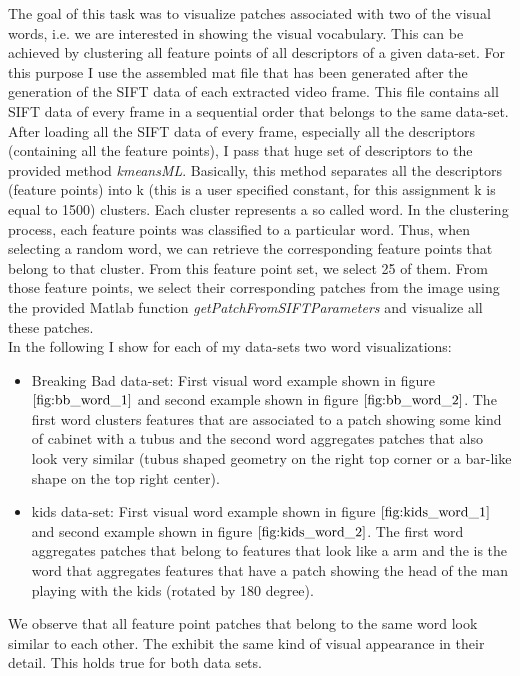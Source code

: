 \documentclass{paper}
\begin{document}
The goal of this task was to visualize patches associated with two of the visual words, i.e. we are interested in showing the visual vocabulary. This can be achieved by clustering all feature points of all descriptors of a given data-set. For this purpose I use the assembled mat file that has been generated after the generation of the SIFT data of each extracted video frame. This file contains all SIFT data of every frame in a sequential order that belongs to the same data-set. \\

After loading all the SIFT data of every frame, especially all the descriptors (containing all the feature points), I pass that huge set of descriptors to the provided method \emph{kmeansML}. Basically, this method separates all the descriptors (feature points) into k (this is a user specified constant, for this assignment k is equal to 1500) clusters. Each cluster represents a so called word. In the clustering process, each feature points was classified to a particular word. Thus, when selecting a random word, we can retrieve the corresponding feature points that belong to that cluster. From this feature point set, we select 25 of them. From those feature points, we select their corresponding patches from the image using the provided Matlab function \emph{getPatchFromSIFTParameters} and visualize all these patches. \\

In the following I show for each of my data-sets two word visualizations:
\begin{itemize}
    \item Breaking Bad data-set: First visual word example shown in figure $\ref{fig:bb_word_1}$ and second example shown in figure $\ref{fig:bb_word_2}$. The first word clusters features that are associated to a patch showing some kind of cabinet with a tubus and the second word aggregates patches that also look very similar (tubus shaped geometry on the right top corner or a bar-like shape on the top right center).
    \item kids data-set: First visual word example shown in figure $\ref{fig:kids_word_1}$ and second example shown in figure $\ref{fig:kids_word_2}$. The first word aggregates patches that belong to features that look like a arm and the is the word that aggregates features that have a patch showing the head of the man playing with the kids (rotated by 180 degree).
\end{itemize}

We observe that all feature point patches that belong to the same word look similar to each other. The exhibit the same kind of visual appearance in their detail. This holds true for both data sets.
\end{document}
